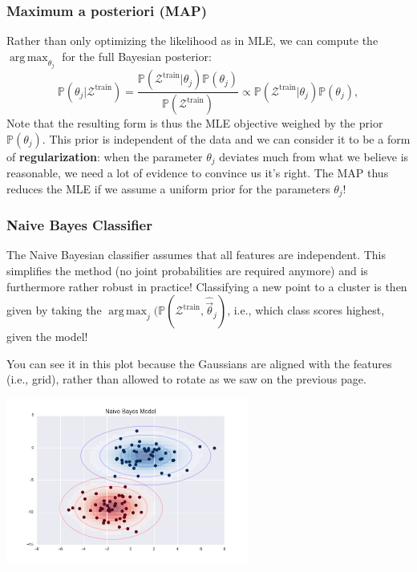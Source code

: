 \documentclass{article}
\DeclareMathOperator*{\argmax}{arg\,max}
\begin{document}
\subsubsection{Maximum a posteriori (MAP)}
Rather than only optimizing the likelihood as in MLE, we can compute the $\argmax_{\theta_j}$ for the full Bayesian posterior:
\begin{equation}
    \mathbb{P}(\theta_j|\mathcal{Z}^\text{train}) = \frac{\mathbb{P}(\mathcal{Z}^\text{train}|\theta_j)\mathbb{P}(\theta_j)}{\mathbb{P}(\mathcal{Z}^\text{train})} \propto \mathbb{P}(\mathcal{Z}^\text{train}|\theta_j)\mathbb{P}(\theta_j),
\end{equation}
Note that the resulting form is thus the MLE objective weighed by the prior $\mathbb{P}(\theta_j)$. This prior is independent of the data and we can consider it to be a form of \textbf{regularization}: when the parameter $\theta_j$ deviates much from what we believe is reasonable, we need a lot of evidence to convince us it's right. The MAP thus reduces the MLE if we assume a uniform prior for the parameters $\theta_j$!

\subsubsection{Naive Bayes Classifier}
The Naive Bayesian classifier assumes that all features are independent. This simplifies the method (no joint probabilities are required anymore) and is furthermore rather robust in practice! Classifying a new point to a cluster is then given by taking the $\argmax_j(\mathbb{P}(\mathcal{Z}^\text{train},\hat{\vec{\theta}}_j)$, i.e., which class scores highest, given the model!
\begin{testexample}
    You can see it in this plot because the Gaussians are aligned with the features (i.e., grid), rather than allowed to rotate as we saw on the previous page.
    \begin{center}\includegraphics[width=0.6\textwidth]{naivegaussian.png}\end{center}
\end{testexample}
\vspace{-0.5cm}
\end{document}
